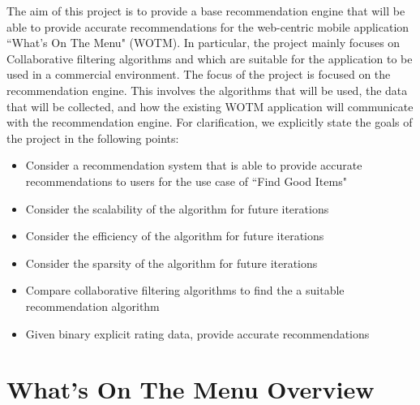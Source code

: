 The aim of this project is to provide a base recommendation engine that will be able to provide accurate recommendations for the web-centric mobile application ``What's On The Menu" (WOTM). In particular, the project mainly focuses on Collaborative filtering algorithms and which are suitable for the application to be used in a commercial environment. The focus of the project is focused on the recommendation engine. This involves the algorithms that will be used, the data that will be collected, and how the existing WOTM application will communicate with the recommendation engine. 
For clarification, we explicitly state the goals of the project in the following points:
\begin{itemize}
	\item{Consider a recommendation system that is able to provide accurate recommendations to users for the use case of ``Find Good Items"}
	\item{Consider the scalability of the algorithm for future iterations}
	\item{Consider the efficiency of the algorithm for future iterations}
	\item{Consider the sparsity of the algorithm for future iterations}
    \item{Compare collaborative filtering algorithms to find the a suitable recommendation algorithm}
	\item{Given binary explicit rating data, provide accurate recommendations}
\end{itemize}




\section{What's On The Menu Overview}

